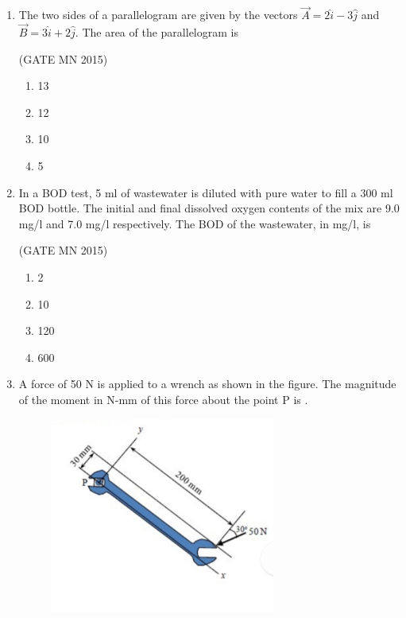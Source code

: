 \documentclass[journal]{IEEEtran}
\begin{document}
\begin{enumerate}
\item The two sides of a parallelogram are given by the vectors $\vec{A} = 2\hat{i} - 3\hat{j}$ and $\vec{B} = 3\hat{i} + 2\hat{j}$. The area of the parallelogram is  

	\hfill(GATE MN 2015)
\begin{multicols}{4}
\begin{enumerate}
\item 13  
\item 12  
\item 10  
\item 5  
\end{enumerate}
\end{multicols}

\item In a BOD test, 5 ml of wastewater is diluted with pure water to fill a 300 ml BOD bottle. The initial and final dissolved oxygen contents of the mix are 9.0 mg/l and 7.0 mg/l respectively. The BOD of the wastewater, in mg/l, is  

	\hfill(GATE MN 2015)
\begin{multicols}{4}
\begin{enumerate}
\item 2  
\item 10  
\item 120  
\item 600  
\end{enumerate}
\end{multicols}

\item A force of 50 N is applied to a wrench as shown in the figure.  
	The magnitude of the moment in N-mm of this force about the point P is \underline{\hspace{2cm}}.  
\begin{figure}[H]                                
\centering                            
\includegraphics[width=0.7\textwidth]{Screenshot_2025_0817_211140.png}       
\caption{}      
\label{fig:Q8}          
\end{figure}



\end{enumerate}
\end{document}
